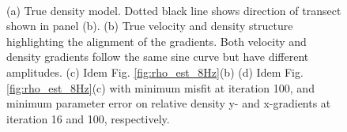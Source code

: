 \documentclass{article}
\begin{document}
\begin{figure}[H]
\begin{subfigure}[c]{0.7\linewidth}
					\end{subfigure}\\ %
					\begin{subfigure}[c]{0.67\linewidth}
					\centering
					\end{subfigure}
					\caption{(a) True density model. Dotted black line shows direction of transect shown in panel (b). (b) True velocity and density structure highlighting the alignment of the gradients. Both velocity and density gradients follow the same sine curve but have different amplitudes. (c) Idem Fig. \ref{fig:rho_est_8Hz}(b) (d) Idem Fig. \ref{fig:rho_est_8Hz}(c) with minimum misfit at iteration 100, and minimum parameter error on relative density y- and x-gradients at iteration 16 and 100, respectively.}
				\label{fig:APP_mod_par1}
			\end{figure}%
\end{document}
